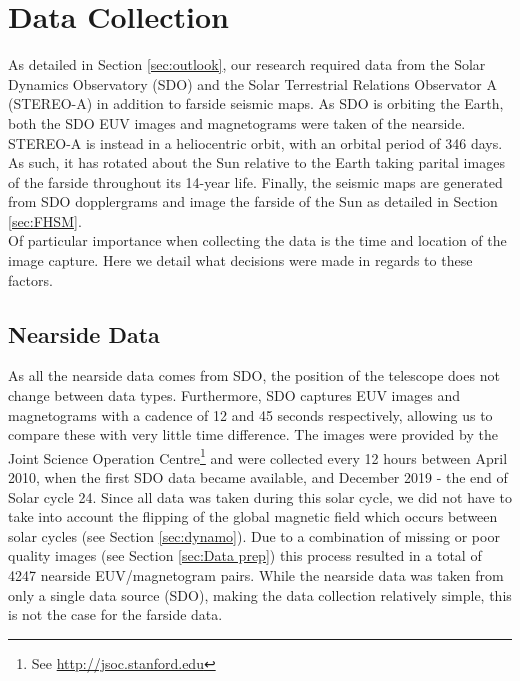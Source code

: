 \documentclass[11pt,a4paper,onecolumn]{report}
\begin{document}
\section{Data Collection}
\label{sec:data_collection}
As detailed in Section \ref{sec:outlook}, our research required data from the
Solar Dynamics Observatory (SDO) and the Solar Terrestrial Relations Observator A
(STEREO-A) in addition to farside seismic maps.
As SDO is orbiting the Earth, both the SDO EUV images and magnetograms were
taken of the nearside. STEREO-A is instead in a heliocentric orbit, with an
orbital period of 346 days. As such, it has rotated about the Sun relative to
the Earth taking parital images of the farside throughout its 14-year life.
Finally, the seismic maps are generated from SDO dopplergrams and image the
farside of the Sun as detailed in Section \ref{sec:FHSM}. \\

Of particular importance when collecting the data is the time and location of
the image capture. Here we detail what decisions were made in regards to these
factors.



\subsection{Nearside Data}
As all the nearside data comes from SDO, the position of the telescope does not
change between data types. Furthermore, SDO captures EUV images and magnetograms
with a cadence of 12 and 45 seconds respectively, allowing us to compare these
with very little time difference. The images were provided by the Joint Science
Operation Centre\footnote{See \url{http://jsoc.stanford.edu}} and were
collected every 12 hours between April 2010, when the first SDO data became
available, and December 2019 - the end of Solar cycle 24. Since all data was
taken during this solar cycle, we did not have to take into account the flipping
of the global magnetic field which occurs between solar cycles (see Section
\ref{sec:dynamo}). Due to a combination of missing or poor quality images (see
Section \ref{sec:Data prep}) this process resulted in a total of 4247 nearside
EUV/magnetogram pairs. While the nearside data was taken from only a single data
source (SDO), making the data collection relatively simple, this is not the case
for the farside data.
\end{document}
